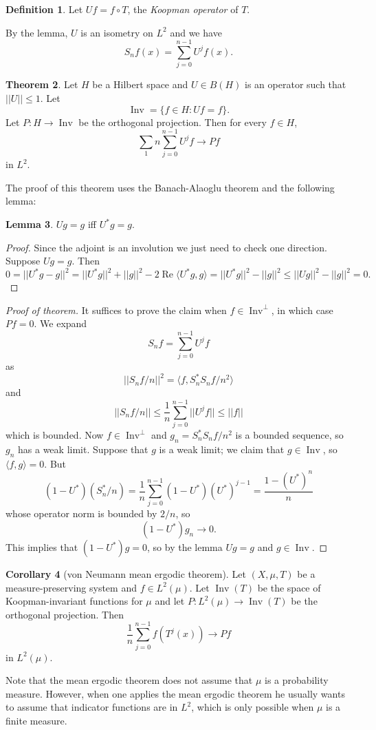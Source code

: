 \documentclass[12pt]{report}
\DeclareMathOperator*{\Inv}{Inv}
\renewcommand{\Re}{\operatorname{Re}}
\newcommand{\dfn}[1]{\emph{#1}\index{#1}}
\theoremstyle{definition}
\newtheorem{theorem}{Theorem}[chapter]
\newtheorem{lemma}[theorem]{Lemma}
\newtheorem{corollary}[theorem]{Corollary}
\newtheorem{definition}[theorem]{Definition}
\begin{document}
\begin{definition}
Let $Uf = f \circ T$, the \dfn{Koopman operator} of $T$.
\end{definition}
By the lemma, $U$ is an isometry on $L^2$ and we have
$$S_nf(x) = \sum_{j=0}^{n-1} U^jf(x).$$
\begin{theorem}
Let $H$ be a Hilbert space and $U \in B(H)$ is an operator such that $||U|| \leq 1$. Let
$$\Inv = \{f \in H: Uf = f\}.$$
Let $P: H \to \Inv$ be the orthogonal projection. Then for every $f \in H$,
$$\sum_{1}{n} \sum_{j=0}^{n-1} U^jf \to Pf$$
in $L^2$.
\end{theorem}
The proof of this theorem uses the Banach-Alaoglu theorem and the following lemma:
\begin{lemma}
$Ug = g$ iff $U^*g = g$.
\end{lemma}
\begin{proof}
Since the adjoint is an involution we just need to check one direction. Suppose $Ug = g$. Then
$$0 = ||U^*g - g||^2 = ||U^*g||^2 + ||g||^2 - 2 \Re \langle U^*g, g\rangle = ||U^*g||^2 - ||g||^2 \leq ||Ug||^2 - ||g||^2 = 0.$$
\end{proof}
\begin{proof}[Proof of theorem]
It suffices to prove the claim when $f \in \Inv^\perp$, in which case $Pf = 0$. We expand
$$S_nf = \sum_{j=0}^{n-1} U^jf$$
as
$$||S_nf/n||^2 = \langle f, S_n^*S_n f/n^2\rangle$$
and
$$||S_nf/n|| \leq \frac{1}{n} \sum_{j=0}^{n-1} ||U^jf|| \leq ||f||$$
which is bounded. Now $f \in \Inv^\perp$ and $g_n = S_n^*S_nf/n^2$ is a bounded sequence, so $g_n$ has a weak limit. Suppose that $g$ is a weak limit; we claim that $g \in \Inv$, so $\langle f, g\rangle = 0$. But
$$(1 - U^*)(S_n^*/n) = \frac{1}{n} \sum_{j=0}^{n-1} (1 - U^*)(U^*)^{j-1} = \frac{1 - (U^*)^n}{n}$$
whose operator norm is bounded by $2/n$, so
$$(1 - U^*)g_n \to 0.$$
This implies that $(1 - U^*)g = 0$, so by the lemma $Ug = g$ and $g \in \Inv$.
\end{proof}
\begin{corollary}[von Neumann mean ergodic theorem]
Let $(X, \mu, T)$ be a measure-preserving system and $f \in L^2(\mu)$. Let $\Inv(T)$ be the space of Koopman-invariant functions for $\mu$ and let $P: L^2(\mu) \to \Inv(T)$ be the orthogonal projection. Then
$$\frac{1}{n} \sum_{j=0}^{n-1} f(T^j(x)) \to Pf$$
in $L^2(\mu)$.
\end{corollary}
Note that the mean ergodic theorem does not assume that $\mu$ is a probability measure. However, when one applies the mean ergodic theorem he usually wants to assume that indicator functions are in $L^2$, which is only possible when $\mu$ is a finite measure.
\end{document}
